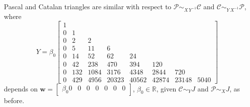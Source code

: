 \begin{example}
Pascal and Catalan triangles are similar with respect to
$\mathcal{P} \sim_{X\,Y^{-1}}\mathcal{C}$ and $\mathcal{C}
\sim_{Y\,X^{-1}}\mathcal{P}$, where 
\begin{displaymath}
Y = \beta_{0} \left[\begin{matrix}1 &  &  &  &  &  &  & \\0 & 1 &  &  &  &  &  & \\0 & 2 & 2 &  &  &  &  & \\0 & 5 & 11 & 6 &  &  &  & \\0 & 14 & 52 & 62 & 24 &  &  & \\0 & 42 & 238 & 470 & 394 & 120 &  & \\0 & 132 & 1084 & 3176 & 4348 & 2844 & 720 & \\0 & 429 & 4956 & 20323 & 40562 & 42874 & 23148 & 5040\end{matrix}\right]
\end{displaymath}
depends on $\displaystyle\boldsymbol{w}= \left[\begin{matrix} \beta_{0} 0 & 0 & 0 & 0 & 0 & 0 & 0 \end{matrix}\right]$, $\beta_{0}\in\mathbb{R}$,
given $\mathcal{C}\sim_{Y}J$ and $\mathcal{P}\sim_{X}J$, as before.
\end{example}


